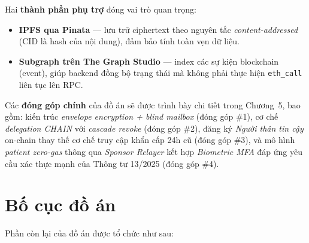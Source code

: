 \documentclass[../DoAn]{subfiles}
\begin{document}
Hai \textbf{thành phần phụ trợ} đóng vai trò quan trọng:

\begin{itemize}
    \item \textbf{IPFS qua Pinata} --- lưu trữ ciphertext theo nguyên tắc \textit{content-addressed} (CID là hash của nội dung), đảm bảo tính toàn vẹn dữ liệu.
    \item \textbf{Subgraph trên The Graph Studio} --- index các sự kiện blockchain (event), giúp backend đồng bộ trạng thái mà không phải thực hiện \texttt{eth\_call} liên tục lên RPC.
\end{itemize}

Các \textbf{đóng góp chính} của đồ án sẽ được trình bày chi tiết trong Chương~5, bao gồm: kiến trúc \textit{envelope encryption + blind mailbox} (đóng góp \#1), cơ chế \textit{delegation CHAIN} với \textit{cascade revoke} (đóng góp \#2), đăng ký \textit{Người thân tin cậy} on-chain thay thế cơ chế truy cập khẩn cấp 24h cũ (đóng góp \#3), và mô hình \textit{patient zero-gas} thông qua \textit{Sponsor Relayer} kết hợp \textit{Biometric MFA} đáp ứng yêu cầu xác thực mạnh của Thông tư 13/2025 (đóng góp \#4).

\section{Bố cục đồ án}

Phần còn lại của đồ án được tổ chức như sau:
\end{document}
